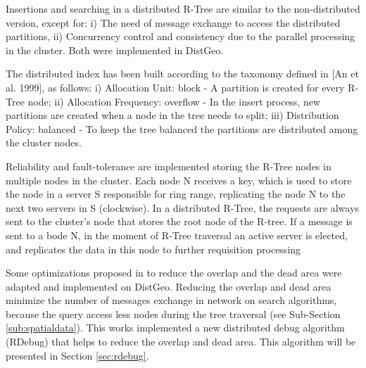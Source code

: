 Insertions and searching in a distributed R-Tree are similar to the non-distributed version, except for: i) The need of message exchange to access the distributed partitions, ii) Concurrency control and consistency due to the parallel processing in the cluster. Both were implemented in DistGeo.

	The distributed index has been built according to the taxonomy defined in [An et al. 1999], as follows: i) Allocation Unit: block - A partition is created for every R-Tree node; ii) Allocation Frequency: overflow - In the insert process, new partitions are created when a node in the tree needs to split; iii) Distribution Policy: balanced - To keep the tree balanced the partitions are distributed among the cluster nodes.
	
Reliability and fault-tolerance are implemented storing the R-Tree nodes in multiple nodes in the cluster. Each node N receives a key, which is used to store the node in a server S responsible for ring range, replicating the node N to the next two servers in S (clockwise). In a distributed R-Tree, the requests are always sent to the cluster's node that stores the root node of the R-tree. If a message is sent to a bode N, in the moment of R-Tree traversal an active server is elected, and replicates the data in this node to further requisition processing

	Some optimizations proposed in \cite{beckmann1990r} to reduce the overlap and the dead area were adapted and implemented on DistGeo. Reducing the overlap and dead area minimize the number of messages exchange in network on search algorithms, because the query access less nodes during the tree traversal (see Sub-Section \ref{sub:spatialdata}). This works implemented a new distributed debug algorithm (RDebug) that helps to reduce the overlap and dead area. This algorithm will be presented in Section \ref{sec:rdebug}.